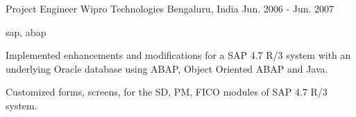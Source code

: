 \cventry
    {Project Engineer} %
    {Wipro Technologies} %
    {Bengaluru, India} %
    {Jun. 2006 - Jun. 2007} %
    {
    \begin{cvitems} %
        \item { sap, abap }
        \item { Implemented enhancements and modifications for a SAP 4.7 R/3 system with an underlying Oracle database using ABAP, Object Oriented ABAP and Java.}
        \item { Customized forms, screens, for the SD, PM, FICO modules of SAP 4.7 R/3 system.}
    \end{cvitems}
    }